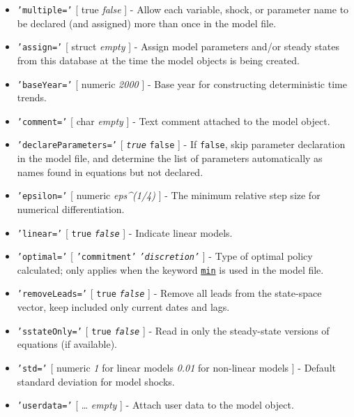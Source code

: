  \begin{itemize}
 \item
   \texttt{'multiple='} {[} true \textbar{} \emph{false} {]} - Allow each
   variable, shock, or parameter name to be declared (and assigned) more
   than once in the model file.
 \item
   \texttt{'assign='} {[} struct \textbar{} \emph{empty} {]} - Assign
   model parameters and/or steady states from this database at the time
   the model objects is being created.
 \item
   \texttt{'baseYear='} {[} numeric \textbar{} \emph{2000} {]} - Base
   year for constructing deterministic time trends.
 \item
   \texttt{'comment='} {[} char \textbar{} \emph{empty} {]} - Text
   comment attached to the model object.
 \item
   \texttt{'declareParameters='} {[} \emph{\texttt{true}} \textbar{}
   \texttt{false} {]} - If \texttt{false}, skip parameter declaration in
   the model file, and determine the list of parameters automatically as
   names found in equations but not declared.
 \item
   \texttt{'epsilon='} {[} numeric \textbar{} \emph{eps\^{}(1/4)} {]} -
   The minimum relative step size for numerical differentiation.
 \item
   \texttt{'linear='} {[} \texttt{true} \textbar{} \emph{\texttt{false}}
   {]} - Indicate linear models.
 \item
   \texttt{'optimal='} {[} \texttt{'commitment'} \textbar{}
   \emph{\texttt{'discretion'}} {]} - Type of optimal policy calculated;
   only applies when the keyword \href{modellang/min}{\texttt{min}} is
   used in the model file.
 \item
   \texttt{'removeLeads='} {[} \texttt{true} \textbar{}
   \emph{\texttt{false}} {]} - Remove all leads from the state-space
   vector, keep included only current dates and lags.
 \item
   \texttt{'sstateOnly='} {[} \texttt{true} \textbar{}
   \emph{\texttt{false}} {]} - Read in only the steady-state versions of
   equations (if available).
 \item
   \texttt{'std='} {[} numeric \textbar{} \emph{1} for linear models
   \textbar{} \emph{0.01} for non-linear models {]} - Default standard
   deviation for model shocks.
 \item
   \texttt{'userdata='} {[} \ldots{} \textbar{} \emph{empty} {]} - Attach
   user data to the model object.
 \end{itemize}
 
